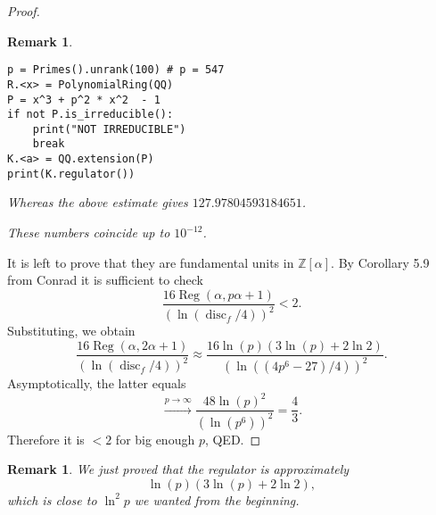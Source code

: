 \documentclass[a4paper]{article}
\newtheorem{Rem}[Thm]{Remark}
\DeclareMathOperator{\Reg}{Reg}        %
\DeclareMathOperator{\disc}{disc}        %
\begin{document}
\begin{proof}
\begin{Rem}
\begin{lstlisting}[style=sagemath, caption=SageMath code example]
p = Primes().unrank(100) # p = 547
R.<x> = PolynomialRing(QQ)
P = x^3 + p^2 * x^2  - 1
if not P.is_irreducible():
    print("NOT IRREDUCIBLE")
    break
K.<a> = QQ.extension(P)
print(K.regulator())
\end{lstlisting}
Whereas the above estimate gives $127.97804593184651$.

These numbers coincide up to $10^{-12} $.
\end{Rem}

It is left to prove that they are fundamental units in $\mathbb{Z}[\alpha]$.
By Corollary 5.9 from Conrad it is sufficient to check
\[
\frac{16 \Reg(\alpha, p\alpha + 1) }
{(\ln(\disc_f/4))^2} 
< 2
.\] 
Substituting, we obtain
\[
\frac{16 \Reg(\alpha, 2\alpha + 1) }
{(\ln(\disc_f/4))^2} 
\approx
\frac{16 
\ln(p) ( 3 \ln(p) + 2 \ln 2 )
 }
{(\ln(
(4 p^6 - 27)
/4))^2} 
.\] 
Asymptotically, the latter equals
\[
\stackrel{p \to \infty}{\longrightarrow}
\frac{48
\ln(p)^2
}
{(\ln(
p^6 ))^2} = \frac{4}{3}
.\] 
Therefore it is $< 2$ for big enough $p$, QED.
\end{proof}

\begin{Rem}
We just proved that the regulator is approximately 
\[
\ln(p) ( 3 \ln(p) + 2 \ln 2 )
,\] 
which is close to $\ln^2 p$ we wanted from the beginning.
\end{Rem}
\end{document}
